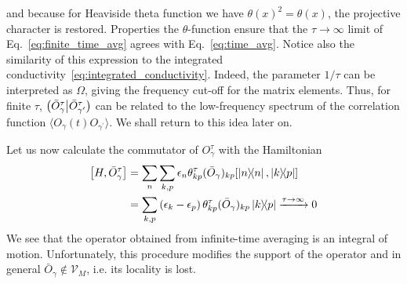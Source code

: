 and because for Heaviside theta function we have \(\theta(x)^2 = \theta(x)\), the projective character is restored.
Properties the \(\theta\)-function ensure that the \(\tau\to\infty\) limit of Eq.~\eqref{eq:finite_time_avg}
agrees with Eq.~\eqref{eq:time_avg}. Notice also the similarity of this expression to the integrated conductivity~\eqref{eq:integrated_conductivity}.
Indeed, the parameter \(1/\tau\) can be interpreted as \(\Omega\), giving the frequency cut-off for the matrix elements.
Thus, for finite \(\tau\), \(\left(\bar{O}_{\gamma}^{\tau} \middle| \bar{O}_{\gamma^{\prime}}^{\tau}\right)\) can be related to the low-frequency spectrum of
the correlation function \(\langle O_{\gamma}(t) O_{\gamma^{\prime}} \rangle\). We shall return to this idea later on.

Let us now calculate the commutator of \(O_{\gamma}^{\tau}\) with the Hamiltonian
\begin{align}
  \comm{H}{\bar{O}_{\gamma}^{\tau}} & = \sum_n \sum_{k,p} \epsilon_n \theta_{kp}^{\tau} (\bar{O}_{\gamma})_{kp} \comm{ \ketbra{n}{n}}{ \ketbra{k}{p}} \nonumber                \\
                                    & = \sum_{k,p} \left(\epsilon_k-\epsilon_p\right) \theta_{kp}^{\tau} (\bar{O}_{\gamma})_{kp} \ketbra{k}{p} \xrightarrow{\tau \to \infty} 0
  \label{eq:time_averaged_commutator}
\end{align}
We see that the operator obtained from infinite-time averaging is an integral of motion. Unfortunately,
this procedure modifies the support of the operator and in general \(\bar{O}_{\gamma} \not\in \mathcal{V}_M\), i.e. its locality is lost.

